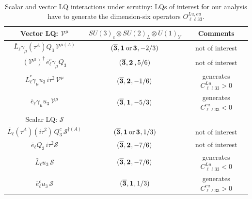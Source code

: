 \begin{table}[!ht]
	\centering
	{
		\begin{tabular}{ccc }
			\toprule
			Vector LQ: $\mathcal{V^\mu}$ & $SU(3)_{c} \otimes SU(2)_{L} \otimes U(1)_{Y}$ & Comments \\
			\midrule
			$ \bar L_\ell  \gamma_\mu (\tau^A) Q_3 \, \mathcal{V}^{\mu (A)} $ & $(\overline{\irrep{3}},\irrep{1}\,\text{or}\,\irrep{3}, -2/3 )$ & not of interest \\
			$  ( \mathcal{V^\mu} )^{\dagger} \,\bar e_\ell^c  \gamma_\mu Q_3 $ & $(\overline{\irrep{3}},\irrep{2}\,, 5/6 )$ & not of interest \\
			$\bar{L}^c_\ell \gamma_\mu u_3\, i\tau^2 \, \mathcal{V^\mu}$ & $(\overline{\irrep{3}},\irrep{2}, -1/6 )$ & generates $C^{Lu}_{\ell \ell 33} > 0$\\
			$ \overline {e}_\ell \gamma_\mu u_3\, \mathcal{V^\mu}$ & $(\overline{\irrep{3}},\irrep{1}, -5/3 )$ & generates $C^{eu}_{\ell \ell 33} < 0$ \\    
			\midrule
			Scalar LQ: $\mathcal{S}$ &  &  \\
			\midrule
			$\bar L_\ell (\tau^A) (i \tau^{2}) \, Q_3^{c} \,\mathcal{S}^{\dagger (A)} $ & $(\overline{\irrep{3}},\irrep{1}\,\text{or}\,\irrep{3} ,1/3 )$ & not of interest  \\    
			$\bar e_\ell Q_3 \,  i \tau^2 \mathcal{S} $ & $(\overline{\irrep{3}},\irrep{2} ,-7/6 )$ & not of interest \\
			$\bar L_\ell u_3\, \mathcal{S} $  & $(\overline{\irrep{3}},\irrep{2} ,-7/6 )$  & generates $C^{Lu}_{\ell \ell 33} < 0$ \\
			$\bar e_\ell^c u_3\, \mathcal{S}$ & $(\overline{\irrep{3}},\irrep{1} ,1/3 )$ & generates $C^{eu}_{\ell \ell 33} > 0$ \\
			\bottomrule
		\end{tabular}
	}
	\caption{Scalar and vector LQ interactions under scrutiny: LQs of interest for our analysis have to generate the dimension-six operators $O^{Lu,eu}_{\ell \ell 33}$.}
	\label{tab:LQmodels}
\end{table}

